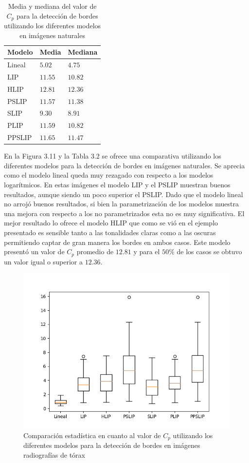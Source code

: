 \begin{table}
	\begin{center}
		\begin{tabular}{|l|l|l|}
			\hline 
			Modelo & Media & Mediana\\
			\hline
			Lineal & $5.02$ & $4.75$\\
			\hline
			LIP & $11.55$ & $10.82$\\
			\hline
			HLIP & $12.81$ & $12.36$\\
			\hline
			PSLIP & $11.57$ & $11.38$\\
			\hline
			SLIP & $9.30$ & $8.91$\\
			\hline
			PLIP & $11.59$ & $10.82$\\
			\hline
			PPSLIP & $11.65$ & $11.47$\\
			\hline
		\end{tabular}
		\caption{Media y mediana del valor de $C_p$ para la detecci\'on de bordes utilizando los diferentes modelos en im\'agenes naturales}
	\end{center}
\end{table}

En la Figura 3.11 y la Tabla 3.2 se ofrece una comparativa utilizando los diferentes modelos para la detecci\'on de bordes en im\'agenes naturales. Se aprecia como el modelo lineal queda muy rezagado con respecto a los modelos logar\'itmicos. En estas im\'agenes el modelo LIP y el PSLIP muestran buenos resultados, aunque siendo un poco superior el PSLIP. Dado que el modelo lineal no arroj\'o buenos resultados, si bien la parametrizaci\'on de los modelos muestra una mejora con respecto a los no parametrizados esta no es muy significativa. El mejor resultado lo ofrece el modelo HLIP que como se vi\'o en el ejemplo presentado es sensible tanto a las tonalidades claras como a las oscuras permitiendo captar de gran manera los bordes en ambos casos. Este modelo present\'o un valor de $C_p$ promedio de $12.81$ y para el $50\%$ de los casos se obtuvo un valor igual o superior a $12.36$. 

\begin{figure}
	\begin{center}
		\includegraphics[width=10.0 cm]{images/graphics/torax/ed/ed_all.png}
		\caption{Comparaci\'on estad\'istica en cuanto al valor de $C_p$ utilizando los diferentes modelos para la detecci\'on de bordes en im\'agenes radiograf\'ias de t\'orax}
	\end{center}
\end{figure}

